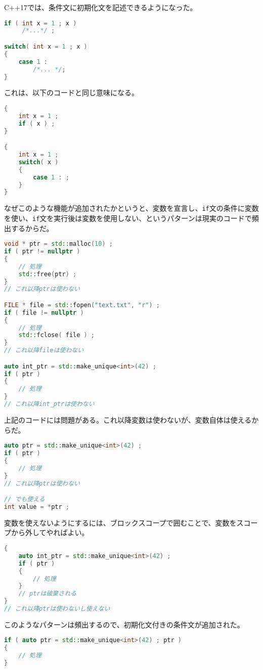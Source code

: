%

C++17では、条件文に初期化文を記述できるようになった。

\begin{lstlisting}[language=C++]
if ( int x = 1 ; x )
     /*...*/ ;

switch( int x = 1 ; x )
{
    case 1 :
        /*... */;
}
\end{lstlisting}

これは、以下のコードと同じ意味になる。

\begin{lstlisting}[language=C++]
{
    int x = 1 ;
    if ( x ) ;
}

{
    int x = 1 ;
    switch( x )
    {
        case 1 : ;
    }
}
\end{lstlisting}

なぜこのような機能が追加されたかというと、変数を宣言し、\lstinline!if!文の条件に変数を使い、\lstinline!if!文を実行後は変数を使用しない、というパターンは現実のコードで頻出するからだ。

\begin{lstlisting}[language=C++]
void * ptr = std::malloc(10) ;
if ( ptr != nullptr )
{
    // 処理
    std::free(ptr) ;
}
// これ以降ptrは使わない

FILE * file = std::fopen("text.txt", "r") ;
if ( file != nullptr )
{
    // 処理
    std::fclose( file ) ;
}
// これ以降fileは使わない

auto int_ptr = std::make_unique<int>(42) ;
if ( ptr )
{
    // 処理
}
// これ以降int_ptrは使わない
\end{lstlisting}

上記のコードには問題がある。これ以降変数は使わないが、変数自体は使えるからだ。

\begin{lstlisting}[language=C++]
auto ptr = std::make_unique<int>(42) ;
if ( ptr )
{
    // 処理
}
// これ以降ptrは使わない

// でも使える
int value = *ptr ;
\end{lstlisting}

変数を使えないようにするには、ブロックスコープで囲むことで、変数をスコープから外してやればよい。

\begin{lstlisting}[language=C++]
{
    auto int_ptr = std::make_unique<int>(42) ;
    if ( ptr )
    {
        // 処理
    }
    // ptrは破棄される
}
// これ以降ptrは使わないし使えない
\end{lstlisting}

このようなパターンは頻出するので、初期化文付きの条件文が追加された。

\begin{lstlisting}[language=C++]
if ( auto ptr = std::make_unique<int>(42) ; ptr )
{
    // 処理
}
\end{lstlisting}

